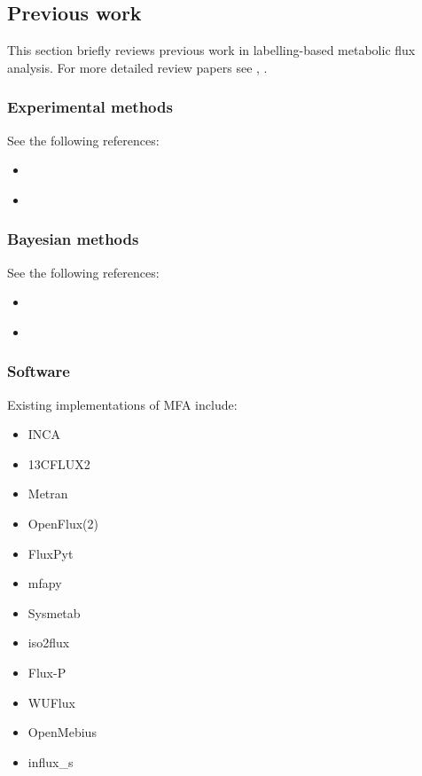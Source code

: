 \documentclass{article}
\def\tightlist{}
\begin{document}
\subsection{Previous work}\label{previous-work}

This section briefly reviews previous work in labelling-based metabolic
flux analysis. For more detailed review papers see
\citep{daiUnderstandingMetabolismFlux2017},
\citep{falcoMetabolicFluxAnalysis2022}.

\subsubsection{Experimental methods}\label{experimental-methods}

See the following references:

\begin{itemize}
\tightlist
\item
  \citep{longHighresolution13CMetabolic2019}
\item
  \citep{falcoMetabolicFluxAnalysis2022}
\end{itemize}

\subsubsection{Bayesian methods}\label{bayesian-methods}

See the following references:

\begin{itemize}
\tightlist
\item
  \citep{theorellBeCertainUncertainty2017}
\item
  \citep{theorellReversibleJumpMCMC2020}
\end{itemize}

\subsubsection{Software}\label{software}

Existing implementations of MFA include:

\begin{itemize}
\tightlist
\item
  INCA
\item
  13CFLUX2
\item
  Metran
\item
  OpenFlux(2)
\item
  FluxPyt
\item
  mfapy
\item
  Sysmetab
\item
  iso2flux
\item
  Flux-P
\item
  WUFlux
\item
  OpenMebius
\item
  influx\_s
\end{itemize}
\end{document}
